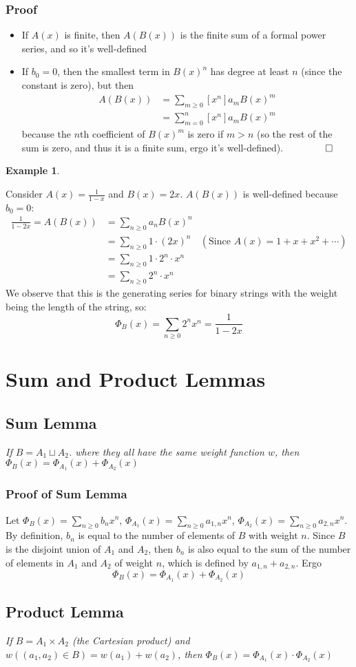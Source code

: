 \documentclass{report}
\newtheorem{ex}{Example}[section]
\begin{document}
\subsubsection{Proof}
\begin{itemize}
\item If $A(x)$ is finite, then $A(B(x))$ is the finite sum of a formal power series, and so it's well-defined
\item If $b_0 = 0$, then the smallest term in $B(x)^n$ has degree at least $n$ (since the constant is zero), but then
\begin{align*}
[x^n]A(B(x)) &= \sum_{m \geq 0}[x^n]a_mB(x)^m \\
&= \sum_{m = 0}^n [x^n]a_mB(x)^m
\end{align*}
because the $n$th coefficient of $B(x)^m$ is zero if $m > n$ (so the rest of the sum is zero, and thus it is a finite sum, ergo it's well-defined). $\qquad \qed$
\end{itemize}
\newpage
\begin{ex}
\end{ex}
Consider $A(x) = \frac{1}{1-x}$ and $B(x) = 2x$. $A(B(x))$ is well-defined because $b_0 = 0$:
\begin{align*}
\frac{1}{1-2x} = A(B(x)) &= \sum_{n \geq 0}a_nB(x)^n \\
&= \sum_{n \geq 0}1\cdot(2x)^n  & (\text{Since } A(x) = 1 + x + x^2 + \cdots) \\
&= \sum_{n \geq 0} 1 \cdot 2^n \cdot x^n \\
&= \sum_{n \geq 0} 2^n \cdot x^n
\end{align*}
We observe that this is the generating series for binary strings with the weight being the length of the string, so:
$$\Phi_B(x) = \sum_{n \geq 0} 2^nx^n = \frac{1}{1-2x}$$
\section{Sum and Product Lemmas}
\subsection{Sum Lemma}
\begin{center}
\textit{If $B = A_1 \sqcup A_2$. where they all have the same weight function $w$, then $\Phi_B(x) = \Phi_{A_1}(x) + \Phi_{A_2}(x)$}
\end{center}
\subsubsection{Proof of Sum Lemma}
Let $\Phi_B(x) = \displaystyle\sum_{n \geq 0}b_nx^n$, $\Phi_{A_1}(x) = \displaystyle\sum_{n \geq 0}a_{1,n}x^n$, $\Phi_{A_2}(x) = \displaystyle\sum_{n \geq 0}a_{2, n}x^n$. By definition, $b_n$ is equal to the number of elements of $B$ with weight $n$. Since $B$ is the disjoint union of $A_1$ and $A_2$, then $b_n$ is also equal to the sum of the number of elements in $A_1$ and $A_2$ of weight $n$, which is defined by $a_{1,n} + a_{2,n}$. Ergo
$$\Phi_B(x) = \Phi_{A_1}(x) + \Phi_{A_2}(x)$$
\subsection{Product Lemma}
\begin{center}
\textit{If $B = A_1 \times A_2$ (the Cartesian product) and $w((a_1, a_2)\in B) = w(a_1) + w(a_2)$, then $\Phi_B(x) = \Phi_{A_1}(x) \cdot \Phi_{A_2}(x)$}
\end{center}
\end{document}
